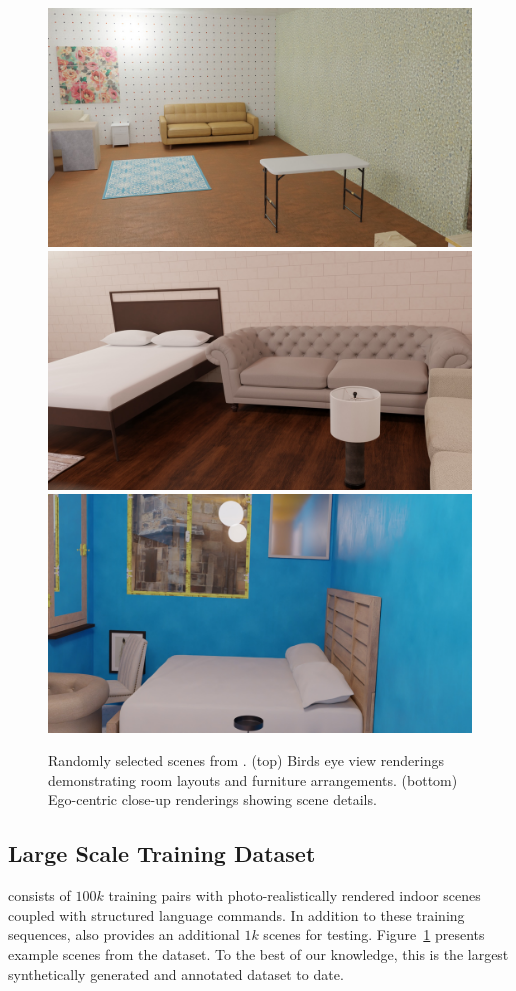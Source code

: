 \begin{figure}[ht]
    \includegraphics[width=0.24\linewidth]{figs/ase_fly_through_renderings/0099.jpg} 
    \includegraphics[width=0.24\linewidth]{figs/ase_fly_through_renderings/0152.jpg} 
    \includegraphics[width=0.24\linewidth]{figs/ase_fly_through_renderings/0754.jpg}
    \caption{Randomly selected scenes from \DatasetName{}.
        (top) Birds eye view renderings 
        demonstrating room layouts and furniture arrangements.
        (bottom) Ego-centric close-up renderings showing scene details.
    }
    \label{fig:dataset_examples}
\end{figure}
%

\subsection{Large Scale Training Dataset}

\DatasetName{} consists of $100k$ training pairs
with photo-realistically rendered indoor scenes
coupled with structured language commands.
In addition to these training sequences, \DatasetName{} also provides an additional $1k$ scenes for testing.
Figure~\ref{fig:dataset_examples} presents example scenes from the dataset.
To the best of our knowledge, this is the largest synthetically generated and annotated dataset to date.
%


